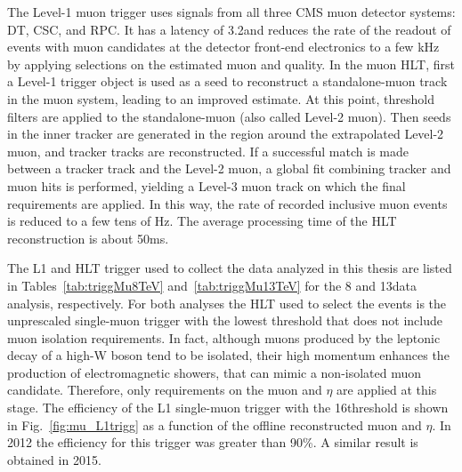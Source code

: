 The Level-1 muon trigger uses signals from all three CMS muon detector systems: DT, CSC, and RPC. It has a latency of 3.2\mus and reduces the rate of the readout of events with muon candidates
at the detector front-end electronics to a few kHz by applying selections on the estimated muon \pt and quality.
In the muon HLT, first a Level-1 trigger object is used as a seed to reconstruct a standalone-muon track in the muon system, leading to an improved \pt estimate. At this point, \pt threshold filters are applied to the standalone-muon (also called Level-2 muon). Then seeds in the inner tracker are generated in the region around the extrapolated Level-2 muon, and tracker tracks are reconstructed. If a successful match is made between a tracker track and the Level-2 muon, a global fit combining tracker and muon hits is performed, yielding a Level-3 muon track on which the final \pt requirements are applied. In this way, the rate of recorded inclusive muon events is reduced to a few tens of Hz. The average processing time of the HLT reconstruction is about 50\unit{ms}.

The L1 and HLT trigger used to collect the data analyzed in this thesis are listed in Tables~\ref{tab:triggMu8TeV} and~\ref{tab:triggMu13TeV} for the 8 and 13\TeV data analysis, respectively.
For both analyses the HLT used to select the events is the unprescaled single-muon trigger with the lowest \pt threshold that does not include muon isolation requirements. 
In fact, although muons produced by the leptonic decay of a high-\pt W boson tend to be isolated, their high momentum enhances the production of electromagnetic showers, that can mimic a non-isolated muon candidate.
Therefore, only requirements on the muon \pt and $\eta$ are applied at this stage.
The efficiency of the L1 single-muon trigger with the 16\GeV threshold is shown in Fig.~\ref{fig:mu_L1trigg} as a function of the offline reconstructed muon \pt and $\eta$. In 2012 the efficiency for this trigger was greater than 90\%. A similar result is obtained in 2015.

